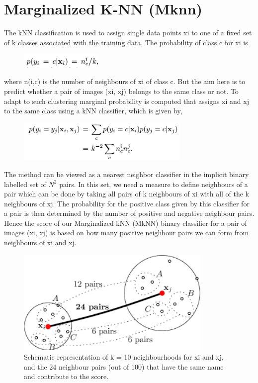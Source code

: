 \documentclass{article}
\begin{document}
\newpage
\section{Marginalized K-NN (Mknn)}\label{sec:mknn}
The kNN classification is used to assign single data points xi to one of a fixed set of k classes associated with the training data. The probability of class c for xi is
\begin{figure}[H]
    \centering
    \includegraphics[height=0.7cm]{./mknn_eq1.png}
\end{figure}
where n(i,c) is the number of neighbours of xi of class c.
But the aim here is to predict whether a pair of images (xi, xj) belongs to the same class or not.
To adapt to such clustering marginal probability is computed that assigns xi and xj to the same class using a kNN classifier, which is given by,
\begin{figure}[H]
    \centering
    \includegraphics[height=2cm]{./mknn_eq2.png}
\end{figure}
The method can be viewed as a nearest neighbor classifier in the implicit binary labelled
set of $N^2$ pairs. In this set, we need a measure to define neighbours of a pair which can be done by taking all pairs of k neighbours of xi with all of the k neighbours of xj.
The probability for the positive class given by this classifier for a pair
is then determined by the number of positive and negative
neighbour pairs.
Hence the score of our Marginalized kNN (MkNN) binary classifier for a pair of images (xi, xj) is based on how many positive neighbour pairs we can form from neighbours of xi and xj. 
\begin{figure}[H]
    \centering
    \includegraphics[height=2in]{./mknn_img1.png}
    \caption[M-KNN Schematic Representation]{Schematic representation of k = 10 neighbourhoods for xi and xj, and the 24 neighbour pairs (out of 100) that have the same name and contribute to the score. }
    \label{fig:fig_name}
    
\end{figure}
\end{document}
